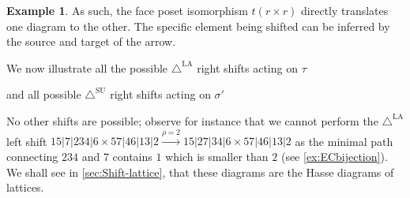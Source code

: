 \documentclass{amsart}
\theoremstyle{definition}
\newtheorem{example}[theorem]{Example}
\newcommand{\SUD}{\triangle^{\mathrm{SU}}}
\newcommand{\LAD}{\triangle^{\mathrm{LA}}}
\begin{document}
\begin{example}
As such, the face poset isomorphism $t(r\times r)$ directly translates one diagram to the other.
The specific element being shifted can be inferred by the source and target of the arrow.
\begin{center}
{\small
{}
}
\end{center}
We now illustrate all the possible $\LAD$ right shifts acting on $\tau$
\begin{center}
\end{center}
and all possible $\SUD$ right shifts acting on $\sigma'$
\begin{center}
\end{center}
No other shifts are possible; observe for instance that we cannot perform the $\LAD$ left shift $15|7|234|6 \times 57|46|13|2 \xrightarrow{\rho=2} 15|27|34|6 \times 57|46|13|2$ as the minimal path connecting $234$ and $7$ contains $1$ which is smaller than $2$ (see \cref{ex:ECbijection}).
We shall see in \cref{sec:Shift-lattice}, that these diagrams are the Hasse diagrams of lattices.
\end{example}
\end{document}
